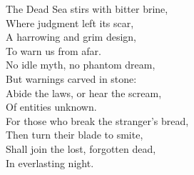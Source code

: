 \begin{lyrics}
The Dead Sea stirs with bitter brine,\\
Where judgment left its scar,\\
A harrowing and grim design,\\
To warn us from afar.\\
No idle myth, no phantom dream,\\
But warnings carved in stone:\\
Abide the laws, or hear the scream,\\
Of entities unknown.\\
For those who break the stranger's bread,\\
Then turn their blade to smite,\\
Shall join the lost, forgotten dead,\\
In everlasting night.
\end{lyrics}

